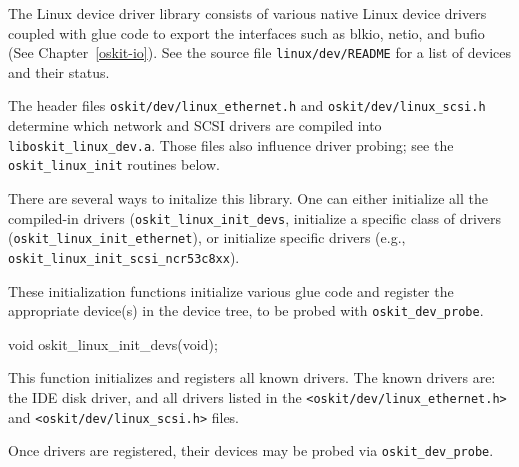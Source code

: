%
% 
%
\label{linux-dev}

The Linux device driver library consists of various native Linux
device drivers coupled with glue code to export the \oskit{}
interfaces such as blkio, netio, and bufio (See Chapter~\ref{oskit-io}).
See the source file \texttt{linux/dev/README} for a list of devices and
their status.

The header files \texttt{oskit/dev/linux_ethernet.h} and
\texttt{oskit/dev/linux_scsi.h} determine which network and SCSI
drivers are compiled into \texttt{liboskit_linux_dev.a}.
Those files also influence driver probing;
see the \texttt{oskit_linux_init} routines below.



There are several ways to initalize this library.
One can either initialize all the compiled-in drivers
(\texttt{oskit_\-linux_\-init_\-devs},
initialize a specific class of drivers
(\texttt{oskit_\-linux_\-init_\-ethernet}),
or initialize specific drivers
(e.g., \texttt{oskit_\-linux_\-init_\-scsi_\-ncr53c8xx}).

These initialization functions initialize various glue code and
register the appropriate device(s) in the device tree,
to be probed with \texttt{oskit_dev_probe}.

\begin{apisyn}

	\funcproto void oskit_linux_init_devs(void);
\end{apisyn}
\begin{apidesc}
	This function initializes and registers all known drivers.
	The known drivers are: the IDE disk driver, and all drivers
	listed in the \texttt{<oskit/dev/linux_ethernet.h>} and
	\texttt{<oskit/dev/linux_scsi.h>} files.

	Once drivers are registered, their devices may be probed
	via \texttt{oskit_dev_probe}.
\end{apidesc}


